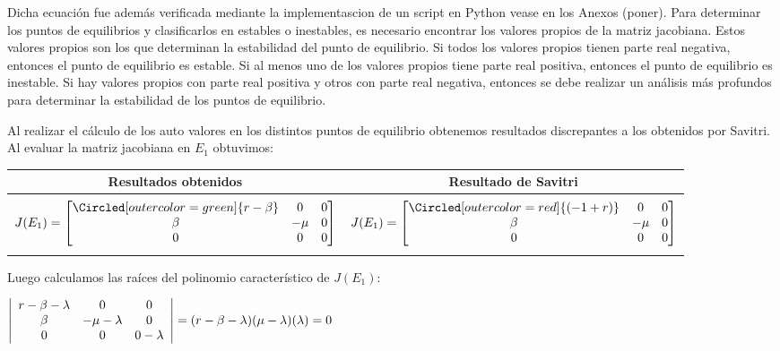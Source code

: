 \documentclass{wscpaperproc}
\theoremstyle{wsc}
\begin{document}
Dicha ecuación fue además verificada mediante la implementascion de un script en Python vease en los Anexos (poner).
Para determinar los puntos de equilibrios y clasificarlos en estables o inestables, es necesario encontrar los valores propios 
de la matriz jacobiana. Estos valores propios son los que determinan la estabilidad del punto de equilibrio. Si todos los valores 
propios tienen parte real negativa, entonces el punto de equilibrio es estable. Si al menos uno de los valores propios tiene parte real positiva, 
entonces el punto de equilibrio es inestable. Si hay valores propios con parte real positiva y otros con parte real negativa, 
entonces se debe realizar un análisis más profundos para determinar la estabilidad de los puntos de equilibrio. \par
Al realizar el c\'alculo de los auto valores en los distintos puntos de equilibrio obtenemos resultados discrepantes a los obtenidos por Savitri. 
Al evaluar la matriz jacobiana en $E_1$ obtuvimos:
\begin{center}
\begin{tabular}{ c c }
	\toprule
	\textbf{Resultados obtenidos} & \textbf{Resultado de Savitri}\\
	\midrule\\
	\addlinespace[-2ex]
	$J(E_1) =\label{Characteristic000t} \begin{bmatrix} 
	\Circled[outer color=green]{r-\beta} & 0            & 0         \\
	\beta          & -\mu         & 0         \\
	0              & 0            & 0 
    \end{bmatrix}$ &
	$J(E_1) =\label{Characteristic000f} \begin{bmatrix} 
	\Circled[outer color=red]{(-1+ r) } & 0            & 0         \\
	\beta          & -\mu & 0         \\
	0              & 0            & 0 
	\end{bmatrix}$\\
	\addlinespace[1.5ex]

	\bottomrule
\end{tabular}
\end{center}


Luego calculamos las raíces del polinomio característico de  $J(E_1)$:
\begin{center}
	

	$\left|\begin{array}{c c c} 
	r-\beta-\lambda &  0  & 0 \\
	\beta   & -\mu-\lambda& 0 \\
	0  &  0   &  0-\lambda\\
	
	\end{array}	\right|
	=
	(r-\beta-\lambda)(\mu-\lambda)(\lambda) = 0
	$
\end{center}	
\end{document}
